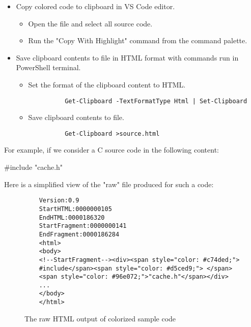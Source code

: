 \documentclass{article}
\begin{document}
\begin{itemize}
  \item Copy colored code to clipboard in VS Code editor.
    \begin{itemize}
      \item Open the file and select all source code.
      \item Run the "Copy With Highlight" command from the command palette.
    \end{itemize}
  \item Save clipboard contents to file in HTML format with commands run in PowerShell terminal.
    \begin{itemize}
      \item Set the format of the clipboard content to HTML.
        \begin{verbatim}
          Get-Clipboard -TextFormatType Html | Set-Clipboard
        \end{verbatim}
      \item Save clipboard contents to file.
        \begin{verbatim}
          Get-Clipboard >source.html
        \end{verbatim}
    \end{itemize}
\end{itemize}

For example, if we consider a C source code in the following content:

\vspace{0.1in}
\begin{verbbox}
#include "cache.h"
\end{verbbox}
\noindent\hspace{1in}\fbox{\theverbbox}
\vspace{0.1in}

Here is a simplified view of the "raw" file produced for such a code:

\begin{figure}
  \centering
  \begin{BVerbatim}
    Version:0.9
    StartHTML:0000000105
    EndHTML:0000186320
    StartFragment:0000000141
    EndFragment:0000186284
    <html>
    <body>
    <!--StartFragment--><div><span style="color: #c74ded;">
    #include</span><span style="color: #d5ced9;"> </span>
    <span style="color: #96e072;">"cache.h"</span></div>
    ...
    </body>
    </html>
  \end{BVerbatim}
  \caption{The raw HTML output of colorized sample code}
  \label{code:syntaxhtml}
\end{figure}
\end{document}

